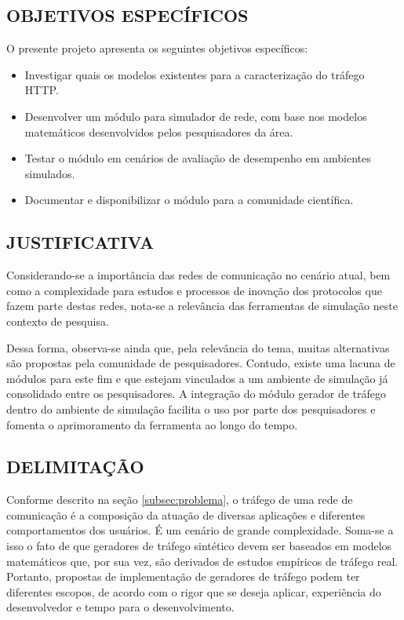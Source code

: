 \subsection{OBJETIVOS ESPECÍFICOS}
\label{subsec:objetivos-específicos}
O presente projeto apresenta os seguintes objetivos específicos:
\begin{itemize}
	\item Investigar quais os modelos existentes para a caracterização do tráfego HTTP.
	\item Desenvolver um módulo para simulador de rede, com base nos modelos matemáticos desenvolvidos pelos pesquisadores da área.
	\item Testar o módulo em cenários de avaliação de desempenho em ambientes simulados.
	\item Documentar e disponibilizar o módulo para a comunidade científica.
\end{itemize}

\subsection{JUSTIFICATIVA}
\label{subsec:justificativa}
Considerando-se a importância das redes de comunicação no cenário atual, bem como a complexidade para estudos e processos de inovação dos protocolos que fazem parte destas redes, nota-se a relevância das ferramentas de simulação neste contexto de pesquisa.


Dessa forma, observa-se ainda que, pela relevância do tema, muitas alternativas são propostas pela comunidade de pesquisadores. Contudo, existe uma lacuna de módulos para este fim e que estejam vinculados a um ambiente de simulação já consolidado entre os pesquisadores. A integração do módulo gerador de tráfego dentro do ambiente de simulação facilita o uso por parte dos pesquisadores e fomenta o aprimoramento da ferramenta ao longo do tempo.


\subsection{DELIMITAÇÃO}
\label{subsec:delimitação}
Conforme descrito na seção \ref{subsec:problema}, o tráfego de uma rede de comunicação é a composição da atuação de diversas aplicações e diferentes comportamentos dos usuários. É um cenário de grande complexidade. Soma-se a isso o fato de que geradores de tráfego sintético devem ser baseados em modelos matemáticos que, por sua vez, são derivados de estudos empíricos de tráfego real. Portanto, propostas de implementação de geradores de tráfego podem ter diferentes escopos, de acordo com o rigor que se deseja aplicar, experiência do desenvolvedor e tempo para o desenvolvimento.

